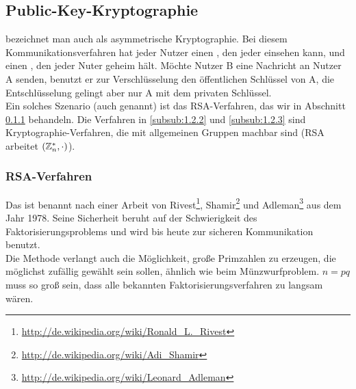 \newpage
\subsection{Public-Key-Kryptographie}
\label{sub:1.2}
	 bezeichnet man auch als asymmetrische Kryptographie.\marginnote{[5]} Bei diesem Kommunikationsverfahren hat jeder Nutzer einen , den jeder einsehen kann, und einen , den jeder Nuter geheim hält. Möchte Nutzer B eine Nachricht an Nutzer A senden, benutzt er zur Verschlüsselung den öffentlichen Schlüssel von A, die Entschlüsselung gelingt aber nur A mit dem privaten Schlüssel.   \\
	Ein solches Szenario (auch  genannt) ist das RSA-Verfahren, das wir in Abschnitt \ref{subsub:1.2.1} behandeln. Die Verfahren in \ref{subsub:1.2.2} und \ref{subsub:1.2.3} sind Kryptographie-Verfahren, die mit allgemeinen Gruppen machbar sind (RSA arbeitet $(\mathbb{Z}_n^*,\cdot)$).
	
\subsubsection{RSA-Verfahren}
\label{subsub:1.2.1}
	Das  ist benannt nach einer Arbeit von Rivest\footnote{\url{http://de.wikipedia.org/wiki/Ronald_L._Rivest}}, Shamir\footnote{\url{http://de.wikipedia.org/wiki/Adi_Shamir}} und Adleman\footnote{\url{http://de.wikipedia.org/wiki/Leonard_Adleman}} aus dem Jahr 1978. Seine Sicherheit beruht auf der Schwierigkeit des Faktorisierungsproblems und wird bis heute zur sicheren Kommunikation benutzt. \\
	Die Methode verlangt auch die Möglichkeit, große Primzahlen zu erzeugen, die möglichst zufällig gewählt sein sollen, ähnlich wie beim Münzwurfproblem. $n = pq$ muss so groß sein, dass alle bekannten Faktorisierungsverfahren zu langsam wären.
	
